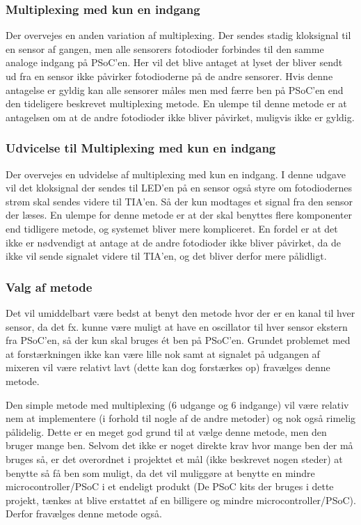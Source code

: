 \documentclass[HardwareDesign/HardwareDesign_main.tex]{subfiles}
\begin{document}
\subsubsection{Multiplexing med kun en indgang}
Der overvejes en anden variation af multiplexing. Der sendes stadig kloksignal til en sensor af gangen, men alle sensorers fotodioder forbindes til den samme analoge indgang på PSoC'en. Her vil det blive antaget at lyset der bliver sendt ud fra en sensor ikke påvirker fotodioderne på de andre sensorer. Hvis denne antagelse er gyldig kan alle sensorer måles men med færre ben på PSoC'en end den tideligere beskrevet multiplexing metode. En ulempe til denne metode er at antagelsen om at de andre fotodioder ikke bliver påvirket, muligvis ikke er gyldig.

\subsubsection{Udvicelse til Multiplexing med kun en indgang}
Der overvejes en udvidelse af multiplexing med kun en indgang. I denne udgave vil det kloksignal der sendes til LED'en på en sensor også styre om fotodiodernes strøm skal sendes videre til TIA'en. Så der kun modtages et signal fra den sensor der læses. En ulempe for denne metode er at der skal benyttes flere komponenter end tidligere metode, og systemet bliver mere kompliceret. En fordel er at det ikke er nødvendigt at antage at de andre fotodioder ikke bliver påvirket, da de ikke vil sende signalet videre til TIA'en, og det bliver derfor mere pålidligt.

\subsubsection{Valg af metode}
Det vil umiddelbart være bedst at benyt den metode hvor der er en kanal til hver sensor, da det fx. kunne være muligt at have en oscillator til hver sensor ekstern fra PSoC'en, så der kun skal bruges ét ben på PSoC'en. Grundet problemet med at forstærkningen ikke kan være lille nok samt at signalet på udgangen af mixeren vil være relativt lavt (dette kan dog forstærkes op) fravælges denne metode. 

Den simple metode med multiplexing (6 udgange og 6 indgange) vil være relativ nem at implementere (i forhold til nogle af de andre metoder) og nok også rimelig pålidelig. Dette er en meget god grund til at vælge denne metode, men den bruger mange ben. Selvom det ikke er noget direkte krav hvor mange ben der må bruges så, er det overordnet i projektet et mål (ikke beskrevet nogen steder) at benytte så få ben som muligt, da det vil muliggøre at benytte en mindre microcontroller/PSoC i et endeligt produkt (De PSoC kits der bruges i dette projekt, tænkes at blive erstattet af en billigere og mindre microcontroller/PSoC). Derfor fravælges denne metode også.
\end{document}
